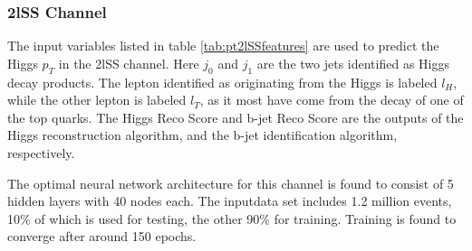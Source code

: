 \subsubsection{2lSS Channel}
\label{subsec:pt2lSS}                                                                                                      

The input variables listed in table \ref{tab:pt2lSSfeatures} are used to predict the Higgs $p_T$ in the 2lSS channel. Here $j_0$ and $j_1$ are the two jets identified as Higgs decay products. The lepton identified as originating from the Higgs is labeled $l_H$, while the other lepton is labeled $l_T$, as it most have come from the decay of one of the top quarks. The Higgs Reco Score and b-jet Reco Score are the outputs of the Higgs reconstruction algorithm, and the b-jet identification algorithm, respectively.



The optimal neural network architecture for this channel is found to consist of 5 hidden layers with 40 nodes each. The inputdata set includes 1.2 million events, 10\% of which is used for testing, the other 90\% for training. Training is found to converge after around 150 epochs. 

\begin{figure}[h!]
    \\
    \caption{}
    \label{fig:pt2lSSresults}
\end{figure}



\begin{figure}[h!]                                                                                                    
    \\
    \caption{}
    \label{fig:pt2lSSroc}
\end{figure}
                                                                                                                            
